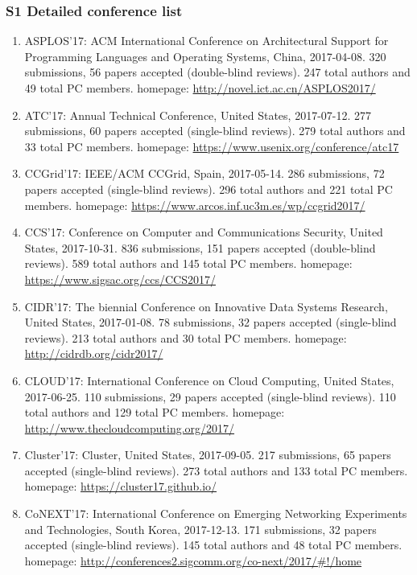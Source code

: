 \documentclass[10pt,letterpaper]{article}
\begin{document}


\hypertarget{s1-detailed-conference-list}{%
\subsubsection*{S1 Detailed conference list}\label{s1-detailed-conference-list}}

\begin{enumerate}
\item ASPLOS'17: ACM International Conference on Architectural Support for Programming Languages and Operating Systems, China, 2017-04-08. 320  submissions, 56 papers accepted (double-blind reviews). 247 total authors and 49 total PC members. homepage: \url{http://novel.ict.ac.cn/ASPLOS2017/}
\item ATC'17: Annual Technical Conference, United States, 2017-07-12. 277  submissions, 60 papers accepted (single-blind reviews). 279 total authors and 33 total PC members. homepage: \url{https://www.usenix.org/conference/atc17}
\item CCGrid'17: IEEE/ACM CCGrid, Spain, 2017-05-14. 286  submissions, 72 papers accepted (single-blind reviews). 296 total authors and 221 total PC members. homepage: \url{https://www.arcos.inf.uc3m.es/wp/ccgrid2017/}
\item CCS'17: Conference on Computer and Communications Security, United States, 2017-10-31. 836  submissions, 151 papers accepted (double-blind reviews). 589 total authors and 145 total PC members. homepage: \url{https://www.sigsac.org/ccs/CCS2017/}
\item CIDR'17: The biennial Conference on Innovative Data Systems Research, United States, 2017-01-08. 78  submissions, 32 papers accepted (single-blind reviews). 213 total authors and 30 total PC members. homepage: \url{http://cidrdb.org/cidr2017/}
\item CLOUD'17: International Conference on Cloud Computing, United States, 2017-06-25. 110  submissions, 29 papers accepted (single-blind reviews). 110 total authors and 129 total PC members. homepage: \url{http://www.thecloudcomputing.org/2017/}
\item Cluster'17: Cluster, United States, 2017-09-05. 217  submissions, 65 papers accepted (single-blind reviews). 273 total authors and 133 total PC members. homepage: \url{https://cluster17.github.io/}
\item CoNEXT'17: International Conference on Emerging Networking Experiments and Technologies, South Korea, 2017-12-13. 171  submissions, 32 papers accepted (single-blind reviews). 145 total authors and 48 total PC members. homepage: \url{http://conferences2.sigcomm.org/co-next/2017/#!/home}

\end{enumerate}
\end{document}
